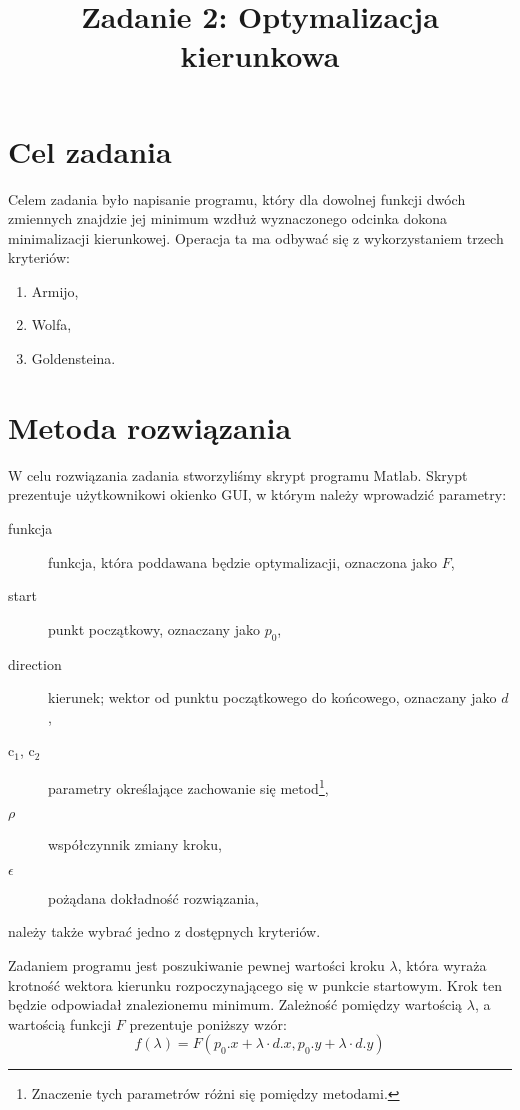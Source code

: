 \documentclass{classrep}
\author{%
  \studentinfo{Michał Janiszewski}{169485} \and
  \studentinfo{Leszek Wach}{xxxxxx}
}
\title{Zadanie 2: Optymalizacja kierunkowa}
\begin{document}
\maketitle

\section{Cel zadania}
Celem zadania było napisanie programu, który dla dowolnej funkcji dwóch zmiennych znajdzie jej minimum wzdłuż wyznaczonego odcinka \ppauza dokona minimalizacji kierunkowej. Operacja ta ma odbywać się z wykorzystaniem trzech kryteriów:
\begin{enumerate}
 \item Armijo,
 \item Wolfa,
 \item Goldensteina.
\end{enumerate}

\section{Metoda rozwiązania}
W celu rozwiązania zadania stworzyliśmy skrypt programu Matlab. Skrypt prezentuje użytkownikowi okienko GUI, w którym należy wprowadzić parametry:
\begin{description}
 \item[funkcja] funkcja, która poddawana będzie optymalizacji, oznaczona jako $F$,
 \item[start] punkt początkowy, oznaczany jako $p_0$,
 \item[direction] kierunek; wektor od punktu początkowego do końcowego, oznaczany jako $d$,
 \item[c$_1$, c$_2$] parametry określające zachowanie się metod\footnote{Znaczenie tych parametrów różni się pomiędzy metodami.},
 \item[$\rho$] współczynnik zmiany kroku,
 \item[$\epsilon$] pożądana dokładność rozwiązania,
\end{description}
należy także wybrać jedno z dostępnych kryteriów.

Zadaniem programu jest poszukiwanie pewnej wartości kroku $\lambda$, która wyraża krotność wektora kierunku rozpoczynającego się w punkcie startowym. Krok ten będzie odpowiadał znalezionemu minimum. Zależność pomiędzy wartością $\lambda$, a wartością funkcji $F$ prezentuje poniższy wzór:
\begin{equation}
 f(\lambda) = F(p_0.x + \lambda \cdot d.x, p_0.y + \lambda \cdot d.y)
\end{equation}
\end{document}
